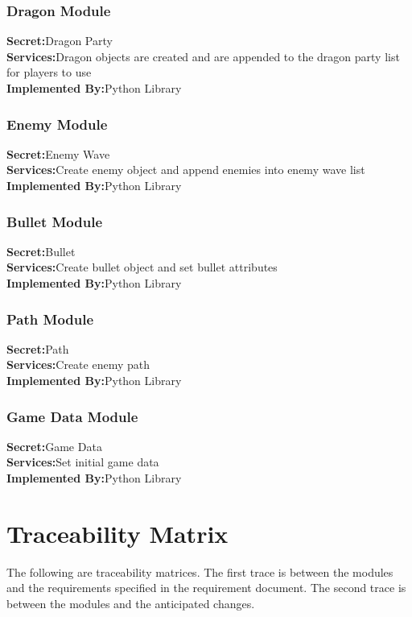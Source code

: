 \documentclass{article}
\begin{document}
\subsubsection{Dragon Module}
\textbf{Secret:}Dragon Party\\
\textbf{Services:}Dragon objects are created and are appended to the dragon party list for players to use\\
\textbf{Implemented By:}Python Library\\

\subsubsection{Enemy Module}
\textbf{Secret:}Enemy Wave\\
\textbf{Services:}Create enemy object and append enemies into enemy wave list\\
\textbf{Implemented By:}Python Library\\

\subsubsection{Bullet Module}
\textbf{Secret:}Bullet\\
\textbf{Services:}Create bullet object and set bullet attributes\\
\textbf{Implemented By:}Python Library\\

\subsubsection{Path Module}
\textbf{Secret:}Path\\
\textbf{Services:}Create enemy path\\
\textbf{Implemented By:}Python Library\\

\subsubsection{Game Data Module}
\textbf{Secret:}Game Data\\
\textbf{Services:}Set initial game data\\
\textbf{Implemented By:}Python Library\\

\section{Traceability Matrix}
The following are traceability matrices. The first trace is between the modules and the requirements specified in the requirement document. The second trace is between the modules and the anticipated changes.
\end{document}
